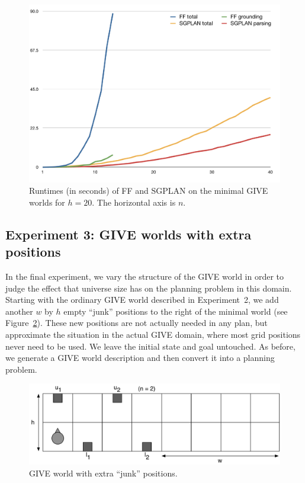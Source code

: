 \begin{figure}
  \centering
  \includegraphics[width=1\columnwidth]{pic-runtime-buttons}
  \caption{Runtimes (in seconds) of FF and SGPLAN on the minimal GIVE
    worlds for $h=20$. The horizontal axis is $n$.}
  \label{fig:give-runtime-minimal}
\end{figure}


\subsection{Experiment 3: GIVE worlds with extra positions}
\label{sec:experiment-3:-give}

In the final experiment, we vary the structure of the GIVE world in order
to judge the effect that universe size has on the planning problem in this
domain.  Starting with the ordinary GIVE world described in Experiment~2,
we add another $w$ by $h$ empty ``junk'' positions to the right of the
minimal world (see Figure~\ref{fig:give-junk}). These new positions are not
actually needed in any plan, but approximate the situation in the actual
GIVE domain, where most grid positions never need to be used. We leave the
initial state and goal untouched. As before, we generate a GIVE world
description and then convert it into a planning problem.

\begin{figure}
  \centering
  \includegraphics[width=1\columnwidth]{pic-empty-buttons}
  \caption{GIVE world with extra ``junk'' positions.}
  \label{fig:give-junk}
\end{figure}

